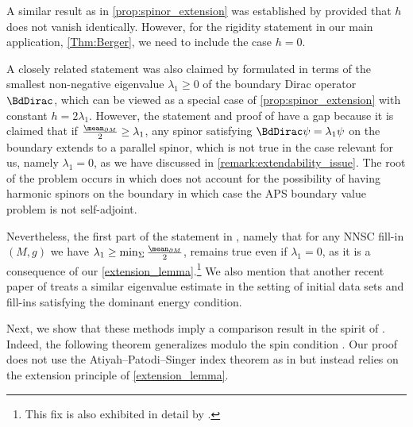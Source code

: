 \documentclass[a4paper,11pt]{amsart}
\numberwithin{equation}{section}
\begin{document}
\begin{remark} \label{remark:previous_results}
A similar result as in \cref{prop:spinor_extension} was established by \textcite[Theorem~1]{Raulot:RigidityCompact} provided that \(h\) does not vanish identically.
However, for the rigidity statement in our main application, \cref{Thm:Berger}, we need to include the case \(h = 0\).

    A closely related statement was also claimed by \textcite[Theorem~6]{Hijazi_etal} formulated in terms of the smallest non-negative eigenvalue \(\lambda_1 \geq 0\) of the boundary Dirac operator \(\BdDirac\), which can be viewed as a special case of \cref{prop:spinor_extension} with constant \(h = 2 \lambda_1\).
    However, the statement and proof of \cite[Theorem~6]{Hijazi_etal} have a gap because it is claimed that if \(\frac{\mean_{\partial M}}{2} \geq \lambda_1\), any spinor satisfying \(\BdDirac \psi = \lambda_1 \psi\) on the boundary extends to a parallel spinor, which is not true in the case relevant for us, namely \(\lambda_1 = 0\), as we have discussed in \cref{remark:extendability_issue}.
    The root of the problem occurs in \cite[Theorem 2]{Hijazi_etal} which does not account for the possibility of having harmonic spinors on the boundary in which case the APS boundary value problem is not self-adjoint.
    
    Nevertheless, the first part of the statement in \cite[Theorem~6]{Hijazi_etal}, namely that for any NNSC fill-in \((M,g)\) we have \(
      \lambda_1 \geq \min_{\Sigma} \frac{\mean_{\partial M}}{2}
    \),
    remains true even if \(\lambda_1 = 0\), as it is a consequence of our \cref{extension_lemma}.\footnote{This fix is also exhibited in detail by \textcite[Appendix A]{baer2024diraceigenvalueshypersphericalradius}.}
    We also mention that another recent paper of \textcite{Raulot_DEC-fillin} treats a similar eigenvalue estimate in the setting of initial data sets and fill-ins satisfying the dominant energy condition.
\end{remark}

Next, we show that these methods imply a comparison result in the spirit of \textcite{GoetteSemmelmann,Lott}.
Indeed, the following theorem generalizes \cite[Theorem~1.3]{Lott} modulo the spin condition . 
Our proof does not use the Atiyah--Patodi--Singer index theorem as in \cite{Lott} but instead relies on the extension principle of \cref{extension_lemma}. 
\end{document}
